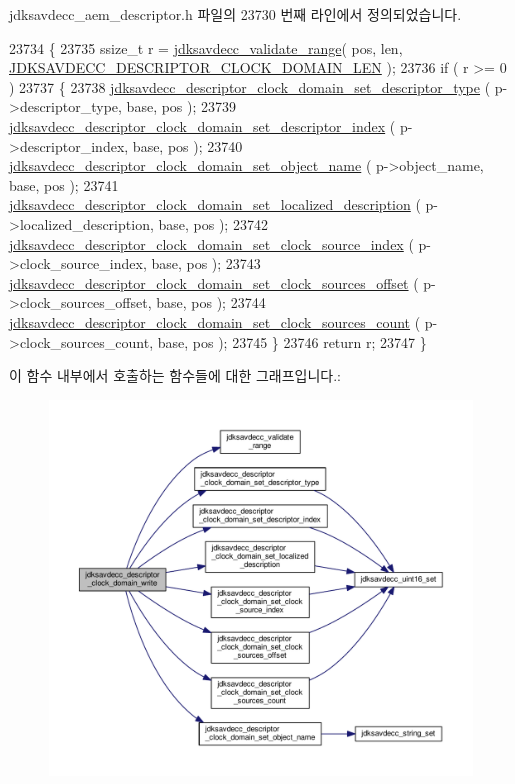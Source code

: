 jdksavdecc\+\_\+aem\+\_\+descriptor.\+h 파일의 23730 번째 라인에서 정의되었습니다.


\begin{DoxyCode}
23734 \{
23735     ssize\_t r = \hyperlink{group__util_ga9c02bdfe76c69163647c3196db7a73a1}{jdksavdecc\_validate\_range}( pos, len, 
      \hyperlink{group__descriptor__clock__domain_gab5413d6a262da98f3cc096cac6d47590}{JDKSAVDECC\_DESCRIPTOR\_CLOCK\_DOMAIN\_LEN} );
23736     \textcolor{keywordflow}{if} ( r >= 0 )
23737     \{
23738         \hyperlink{group__descriptor__clock__domain_ga383281f4f9c0b0835132e69a7a48eb55}{jdksavdecc\_descriptor\_clock\_domain\_set\_descriptor\_type}
      ( p->descriptor\_type, base, pos );
23739         \hyperlink{group__descriptor__clock__domain_ga3867eb3d325993605e4081467f9c7c36}{jdksavdecc\_descriptor\_clock\_domain\_set\_descriptor\_index}
      ( p->descriptor\_index, base, pos );
23740         \hyperlink{group__descriptor__clock__domain_gaaeb3b6b3d510700bb2a322b856241a04}{jdksavdecc\_descriptor\_clock\_domain\_set\_object\_name}
      ( p->object\_name, base, pos );
23741         \hyperlink{group__descriptor__clock__domain_ga5994a25475af83356f0aacfde38bee4c}{jdksavdecc\_descriptor\_clock\_domain\_set\_localized\_description}
      ( p->localized\_description, base, pos );
23742         \hyperlink{group__descriptor__clock__domain_ga9779a3f76622d37697677fdfc988dfe9}{jdksavdecc\_descriptor\_clock\_domain\_set\_clock\_source\_index}
      ( p->clock\_source\_index, base, pos );
23743         \hyperlink{group__descriptor__clock__domain_gab5b725c7078ed415455913e312694136}{jdksavdecc\_descriptor\_clock\_domain\_set\_clock\_sources\_offset}
      ( p->clock\_sources\_offset, base, pos );
23744         \hyperlink{group__descriptor__clock__domain_gac516bc5b6467d0f8583def073988e2ad}{jdksavdecc\_descriptor\_clock\_domain\_set\_clock\_sources\_count}
      ( p->clock\_sources\_count, base, pos );
23745     \}
23746     \textcolor{keywordflow}{return} r;
23747 \}
\end{DoxyCode}


이 함수 내부에서 호출하는 함수들에 대한 그래프입니다.\+:
\nopagebreak
\begin{figure}[H]
\begin{center}
\leavevmode
\includegraphics[width=350pt]{group__descriptor__clock__domain_gaea18c7c09a894ddadbb40d2402205b40_cgraph}
\end{center}
\end{figure}


